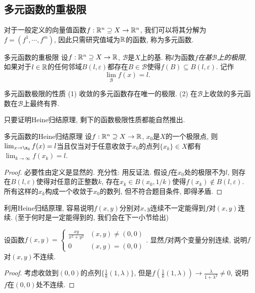 \subsection{多元函数的重极限}

对于一般定义的向量值函数$f:\mathbb{R} ^n \supseteq X \to \mathbb{R} ^n$, 我们可以将其分解为$f=(f^1,\cdots ,f^m)$, 因此只需研究值域为$\mathbb{R}$的函数, 称为多元函数. 

\begin{definition}{多元函数的重极限}
	设$f: \mathbb{R} ^n \supseteq X \to \mathbb{R}$, $\mathcal{B}$是$X$上的基. 称$l$为函数$f$\textit{在基$\mathcal{B}$上的极限}, 如果对于$l \in \mathbb{R}$的任何邻域$B(l,\varepsilon)$都存在$B \in \mathcal{B}$使得$f(B) \subseteq B(l,\varepsilon)$. 记作$$\lim_{\mathcal{B}}f(x)=l.$$
\end{definition}

\begin{proposition}{多元函数极限的性质}
	(1) 收敛的多元函数存在唯一的极限. \qquad (2) 在$\mathcal{B}$上收敛的多元函数在$\mathcal{B}$上最终有界. 
\end{proposition}

只要证明Heine归结原理, 剩下的函数极限性质都能自然推出. 

\begin{theorem}{多元函数的Heine归结原理}
	设$f: \mathbb{R} ^n \supseteq X \to \mathbb{R}$, $x_0$是$X$的一个极限点, 则$\lim_{x\to \x_0}f(x)=l$当且仅当对于任意收敛于$x_0$的点列$\{ x_k \} \in X$都有$\lim_{k\to \infty} f(x_k)=l$. 
\end{theorem}
\begin{proof}
	必要性由定义是显然的. 充分性: 用反证法. 假设$f$在$x_0$处的极限不为$l$, 则存在$B(l,\varepsilon)$使得对任意的正整数$k$, 存在$x_k \in B(x_0,1/k)$使得$f(x_k) \notin B(l,\varepsilon)$. 所有这样的$x_k$构成一个收敛于$x_0$的数列, 但不符合题目条件, 即得矛盾. 
\end{proof}

利用Heine归结原理, 容易说明$f(x,y)$分别对$x,y$连续不一定能得到$f$对$(x,y)$连续. (至于何时是一定能得到的, 我们会在下一小节给出)

\begin{example}
	设函数$f(x,y) = \begin{cases}
 \frac{xy}{x^2+y^2} &  (x,y) \neq (0,0) \\
 0 &  (x,y) = (0,0)
\end{cases}$. 显然$f$对两个变量分别连续, 说明$f$对$(x,y)$不连续. 
\end{example}
\begin{proof}
	考虑收敛到$(0,0)$的点列$\{ \frac{1}{k}(1,\lambda) \}$, 但是$f(\frac{1}{k}(1,\lambda)) \to \frac{\lambda}{1+\lambda ^2} \neq 0$, 说明$f$在$(0,0)$处不连续. 
\end{proof}

